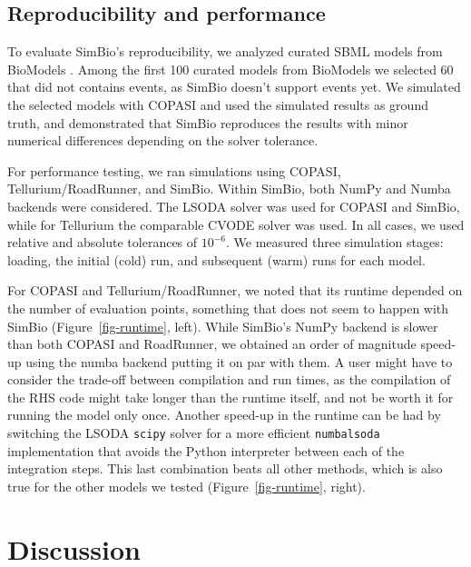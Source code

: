 \documentclass{article}
\begin{document}


\hypertarget{reproducibility-and-performance}{%
\subsection{Reproducibility and
performance}\label{reproducibility-and-performance}}



To evaluate SimBio's reproducibility, we analyzed curated \ac{SBML} models
from BioModels \cite{malik-sheriffBioModels15Years2020}. Among the first 100 curated
models from BioModels we selected 60 that did not contains events, as
SimBio doesn't support events yet. We simulated the selected models with
COPASI and used the simulated results as ground truth, and demonstrated
that SimBio reproduces the results with minor numerical differences
depending on the solver tolerance.

For performance testing, we ran simulations using COPASI,
Tellurium/RoadRunner, and SimBio. Within SimBio, both NumPy and Numba
backends were considered. The LSODA solver was used for COPASI and
SimBio, while for Tellurium the comparable CVODE solver was used. In all
cases, we used relative and absolute tolerances of \(10^{-6}\). We
measured three simulation stages: loading, the initial (cold) run, and
subsequent (warm) runs for each model.

For COPASI and Tellurium/RoadRunner, we noted that its runtime depended
on the number of evaluation points, something that does not seem to
happen with SimBio (Figure~\ref{fig-runtime}, left). While SimBio's
NumPy backend is slower than both COPASI and RoadRunner, we obtained an
order of magnitude speed-up using the numba backend putting it on par
with them. A user might have to consider the trade-off between
compilation and run times, as the compilation of the
\ac{RHS} code might take longer than the runtime itself, and not be worth
it for running the model only once. Another speed-up in the runtime can
be had by switching the LSODA \texttt{scipy} solver for a more efficient
\texttt{numbalsoda} implementation that avoids the Python interpreter
between each of the integration steps. This last combination beats all
other methods, which is also true for the other models we tested
(Figure~\ref{fig-runtime}, right).

\hypertarget{discussion}{%
\section{Discussion}\label{discussion}}
\end{document}
